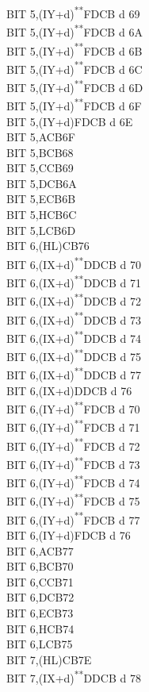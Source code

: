 \documentclass[twoside,openright,a4paper]{book}
\newcommand{\UNDOC}{\textnormal{\textsuperscript{**}}}
\begin{document}
\begin{multicols}{3}
{\begin{tabbing}
	BIT 5,(IY+d)\UNDOC\>FDCB d 69\\
	BIT 5,(IY+d)\UNDOC\>FDCB d 6A\\
	BIT 5,(IY+d)\UNDOC\>FDCB d 6B\\
	BIT 5,(IY+d)\UNDOC\>FDCB d 6C\\
	BIT 5,(IY+d)\UNDOC\>FDCB d 6D\\
	BIT 5,(IY+d)\UNDOC\>FDCB d 6F\\
	BIT 5,(IY+d)\>FDCB d 6E\\
	BIT 5,A\>CB6F\\
	BIT 5,B\>CB68\\
	BIT 5,C\>CB69\\
	BIT 5,D\>CB6A\\
	BIT 5,E\>CB6B\\
	BIT 5,H\>CB6C\\
	BIT 5,L\>CB6D\\
	BIT 6,(HL)\>CB76\\
	BIT 6,(IX+d)\UNDOC\>DDCB d 70\\
	BIT 6,(IX+d)\UNDOC\>DDCB d 71\\
	BIT 6,(IX+d)\UNDOC\>DDCB d 72\\
	BIT 6,(IX+d)\UNDOC\>DDCB d 73\\
	BIT 6,(IX+d)\UNDOC\>DDCB d 74\\
	BIT 6,(IX+d)\UNDOC\>DDCB d 75\\
	BIT 6,(IX+d)\UNDOC\>DDCB d 77\\
	BIT 6,(IX+d)\>DDCB d 76\\
	BIT 6,(IY+d)\UNDOC\>FDCB d 70\\
	BIT 6,(IY+d)\UNDOC\>FDCB d 71\\
	BIT 6,(IY+d)\UNDOC\>FDCB d 72\\
	BIT 6,(IY+d)\UNDOC\>FDCB d 73\\
	BIT 6,(IY+d)\UNDOC\>FDCB d 74\\
	BIT 6,(IY+d)\UNDOC\>FDCB d 75\\
	BIT 6,(IY+d)\UNDOC\>FDCB d 77\\
	BIT 6,(IY+d)\>FDCB d 76\\
	BIT 6,A\>CB77\\
	BIT 6,B\>CB70\\
	BIT 6,C\>CB71\\
	BIT 6,D\>CB72\\
	BIT 6,E\>CB73\\
	BIT 6,H\>CB74\\
	BIT 6,L\>CB75\\
	BIT 7,(HL)\>CB7E\\
	BIT 7,(IX+d)\UNDOC\>DDCB d 78\\

\end{tabbing}}
\end{multicols}
\end{document}
